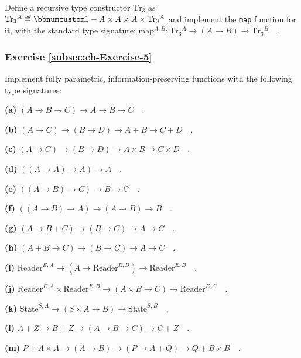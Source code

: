Define a recursive type constructor $\text{Tr}_{3}$ as $\text{Tr}_{3}{}^{A}\triangleq\bbnum 1+A\times A\times A\times\text{Tr}_{3}{}^{A}$
and implement the \lstinline!map! function for it, with the standard
type signature: $\text{map}^{A,B}:\text{Tr}_{3}{}^{A}\rightarrow\left(A\rightarrow B\right)\rightarrow\text{Tr}_{3}{}^{B}\quad.$

\subsubsection{Exercise \label{subsec:ch-Exercise-5}\ref{subsec:ch-Exercise-5}}

Implement fully parametric, information-preserving functions with
the following type signatures:

\textbf{(a)} $\left(A\rightarrow B\rightarrow C\right)\rightarrow A\rightarrow B\rightarrow C\quad.$

\textbf{(b)} $\left(A\rightarrow C\right)\rightarrow\left(B\rightarrow D\right)\rightarrow A+B\rightarrow C+D\quad.$

\textbf{(c)} $\left(A\rightarrow C\right)\rightarrow\left(B\rightarrow D\right)\rightarrow A\times B\rightarrow C\times D\quad.$

\textbf{(d)} $((A\rightarrow A)\rightarrow A)\rightarrow A\quad.$

\textbf{(e)} $\left(\left(A\rightarrow B\right)\rightarrow C\right)\rightarrow B\rightarrow C\quad.$

\textbf{(f)} $((A\rightarrow B)\rightarrow A)\rightarrow\left(A\rightarrow B\right)\rightarrow B\quad.$

\textbf{(g)} $(A\rightarrow B+C)\rightarrow(B\rightarrow C)\rightarrow A\rightarrow C\quad.$

\textbf{(h)} $(A+B\rightarrow C)\rightarrow(B\rightarrow C)\rightarrow A\rightarrow C\quad.$

\textbf{(i)} $\text{Reader}^{E,A}\rightarrow(A\rightarrow\text{Reader}^{E,B})\rightarrow\text{Reader}^{E,B}\quad.$

\textbf{(j)} $\text{Reader}^{E,A}\times\text{Reader}^{E,B}\rightarrow(A\times B\rightarrow C)\rightarrow\text{Reader}^{E,C}\quad.$

\textbf{(k)} $\text{State}^{S,A}\rightarrow\left(S\times A\rightarrow B\right)\rightarrow\text{State}^{S,B}\quad.$

\textbf{(l)} $A+Z\rightarrow B+Z\rightarrow(A\rightarrow B\rightarrow C)\rightarrow C+Z\quad.$

\textbf{(m)} $P+A\times A\rightarrow(A\rightarrow B)\rightarrow(P\rightarrow A+Q)\rightarrow Q+B\times B\quad.$


